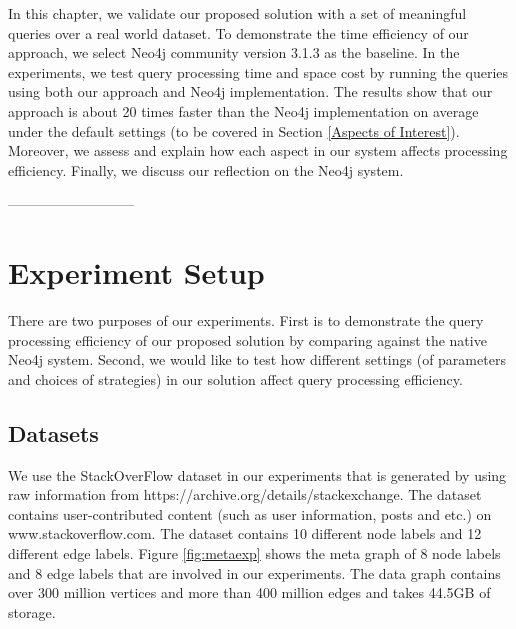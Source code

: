 In this chapter, we validate our proposed solution with a set of meaningful queries over a real world dataset. To demonstrate the time efficiency of our approach, we select Neo4j community version 3.1.3 as the baseline. In the experiments, we test query processing time and space cost by running the queries using both our approach and Neo4j implementation.  The results show that our approach is about 20 times faster than the Neo4j implementation on average under the default settings (to be covered in Section \ref{Aspects of Interest}). Moreover, we assess and explain how each aspect in our system affects processing efficiency. Finally, we discuss our reflection on the Neo4j system.

---------------------------
\section{Experiment Setup}


There are two purposes of our experiments. First is to demonstrate the query processing efficiency of our proposed solution by comparing against the native Neo4j system. Second, we would like to test how different settings (of parameters and choices of strategies) in our solution affect query processing efficiency. %

\subsection{Datasets}

We use the StackOverFlow dataset in our experiments that is generated by using raw information from https://archive.org/details/stackexchange. The dataset contains user-contributed content (such as user information, posts and etc.) on www.stackoverflow.com. The dataset contains 10 different node labels and 12 different edge labels.  Figure \ref{fig:metaexp} shows the meta graph of 8 node labels and 8 edge labels that are involved in our experiments. The data graph contains over 300 million vertices and more than 400 million edges and takes 44.5GB of storage.
\par

